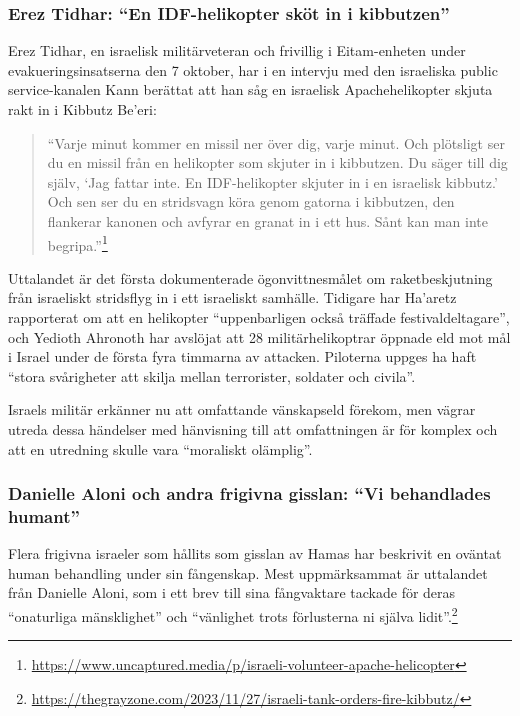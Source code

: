 \subsubsection*{Erez Tidhar: “En IDF-helikopter sköt in i kibbutzen”}


Erez Tidhar, en israelisk militärveteran och frivillig i Eitam-enheten under evakueringsinsatserna den 7 oktober, har i en intervju med den israeliska public service-kanalen Kann berättat att han såg en israelisk Apachehelikopter skjuta rakt in i Kibbutz Be’eri:

\begin{quote}
“Varje minut kommer en missil ner över dig, varje minut. Och plötsligt ser du en missil från en helikopter som skjuter in i kibbutzen. Du säger till dig själv, ‘Jag fattar inte. En IDF-helikopter skjuter in i en israelisk kibbutz.’ Och sen ser du en stridsvagn köra genom gatorna i kibbutzen, den flankerar kanonen och avfyrar en granat in i ett hus. Sånt kan man inte begripa.”\footnote{\url{https://www.uncaptured.media/p/israeli-volunteer-apache-helicopter}}
\end{quote}

Uttalandet är det första dokumenterade ögonvittnesmålet om raketbeskjutning från israeliskt stridsflyg in i ett israeliskt samhälle. Tidigare har Ha’aretz rapporterat om att en helikopter “uppenbarligen också träffade festivaldeltagare”, och Yedioth Ahronoth har avslöjat att 28 militärhelikoptrar öppnade eld mot mål i Israel under de första fyra timmarna av attacken. Piloterna uppges ha haft “stora svårigheter att skilja mellan terrorister, soldater och civila”.

Israels militär erkänner nu att omfattande vänskapseld förekom, men vägrar utreda dessa händelser med hänvisning till att omfattningen är för komplex och att en utredning skulle vara “moraliskt olämplig”.

\subsubsection*{Danielle Aloni och andra frigivna gisslan: “Vi behandlades humant”}


Flera frigivna israeler som hållits som gisslan av Hamas har beskrivit en oväntat human behandling under sin fångenskap. Mest uppmärksammat är uttalandet från Danielle Aloni, som i ett brev till sina fångvaktare tackade för deras “onaturliga mänsklighet” och “vänlighet trots förlusterna ni själva lidit”.\footnote{\url{https://thegrayzone.com/2023/11/27/israeli-tank-orders-fire-kibbutz/}}

